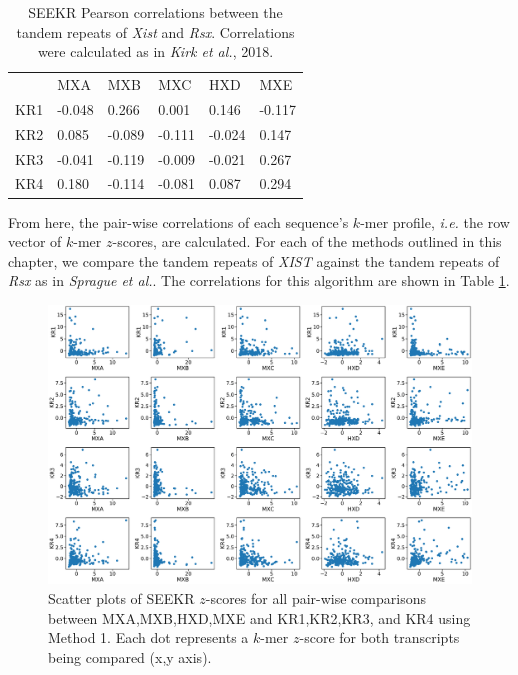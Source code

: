 \begin{table}[ht]
\begin{center}
\begin{tabular}{llllll}
&MXA & MXB                   & MXC                  & HXD                   & MXE                                         \\
KR1 & -0.048 & 0.266   & 0.001 & 0.146    & -0.117 \\
KR2 & 0.085   & -0.089  & -0.111  & -0.024 & 0.147  \\
KR3 & -0.041 & -0.119   & -0.009 & -0.021 & 0.267   \\
KR4 & 0.180   & -0.114 & -0.081  & 0.087   & 0.294 
\end{tabular}
\caption[Kirk et al. $k$-mer counting]{SEEKR Pearson correlations between the tandem repeats of \emph{Xist} and \emph{Rsx}. Correlations were calculated as in \emph{Kirk et al.}, 2018.}
\label{tbl:kmers1}

\end{center}
\end{table}

From here, the pair-wise correlations of each sequence's $k$-mer profile, \emph{i.e.} the row vector of $k$-mer $z$-scores, are calculated. For each of the methods outlined in this chapter, we compare the tandem repeats of \emph{XIST} against the tandem repeats of \emph{Rsx} as in \emph{Sprague et al.}. The correlations for this algorithm are shown in Table \ref{tbl:kmers1}.

\begin{figure}[h]
\centering
\includegraphics[width=\textwidth]{images/natgen.pdf}
\caption[Kirk et al. $k$-mer counting $z$-score scatter plots]{Scatter plots of SEEKR $z$-scores for all pair-wise comparisons between MXA,MXB,HXD,MXE and KR1,KR2,KR3, and KR4 using Method 1. Each dot represents a $k$-mer $z$-score for both transcripts being compared (x,y axis).}
\label{fig:natgenscat}
\end{figure}

